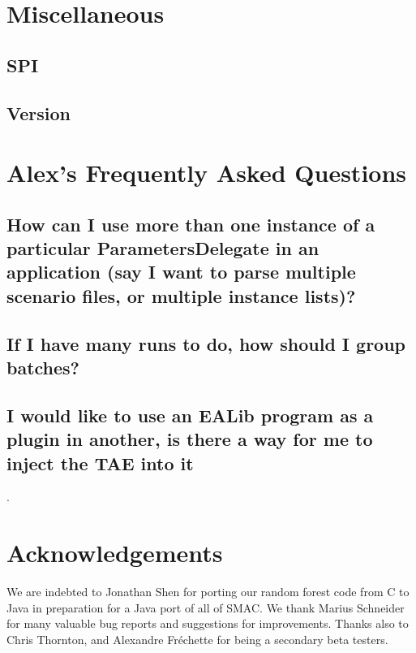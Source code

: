 \documentclass[11pt,letterpaper,oneside]{article}
\begin{document}
\section{Miscellaneous}


\subsection{SPI}
\label{sec:misc-spi}

\subsection{Version}
\label{sec:version}



\section{Alex's Frequently Asked Questions}

\subsection{How can I use more than one instance of a particular ParametersDelegate in an application (say I want to parse multiple scenario files, or multiple instance lists)?}

\subsection{If I have many runs to do, how should I group batches?}

\subsection{I would like to use an EALib program as a plugin in another, is there a way for me to inject the TAE into it}.




\section{Acknowledgements}

We are indebted to Jonathan Shen for porting our random forest code from C to Java in preparation for a Java port of all of SMAC. We thank Marius Schneider for many valuable bug reports and suggestions for improvements. Thanks also to Chris Thornton, and Alexandre Fr\'echette for being a secondary beta testers.


\renewcommand{\bibsection}{\section{References}}


\end{document}
